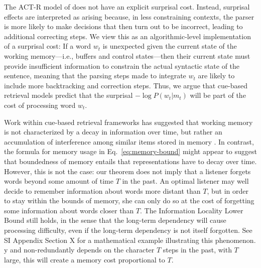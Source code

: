 The ACT-R model of \cite{lewis-activation-based-2005} does not have an explicit surprisal cost.
Instead, surprisal effects are interpreted as arising because, in less constraining contexts, the parser is more likely to make decisions that then turn out to be incorrect, leading to additional correcting steps.
We view this as an algorithmic-level implementation of a surprisal cost:
If a word $w_t$ is unexpected given the current state of the working memory---i.e., buffers and control states---then their current state must provide insufficient information to constrain the actual syntactic state of the sentence, meaning that the parsing steps made to integrate $w_t$ are likely to include more backtracking and correction steps.
Thus, we argue that cue-based retrieval models predict that the surprisal $- \log P(w_t|m_t)$ will be part of the cost of processing word $w_t$.

Work within cue-based retrieval frameworks has suggested that working memory is not characterized by a decay in information over time, but rather an accumulation of interference among similar items stored in memory \citep[][p. 408]{lewis-activation-based-2005}.
In contrast, the formula for memory usage in Eq.~\ref{eq:memory-bound} might appear to suggest that boundedness of memory entails that representations have to decay over time.
However, this is not the case:
our theorem does not imply that a listener forgets words beyond some amount of time $T$ in the past. 
An optimal listener may well decide to remember information about words more distant than $T$, but in order to stay within the bounds of memory, she can only do so at the cost of forgetting some information about words closer than $T$.
The Information Locality Lower Bound still holds, in the sense that the long-term dependency will cause processing difficulty, even if the long-term dependency is not itself forgotten.
See SI Appendix Section X for a mathematical example illustrating this phenomenon.
y and non-redundantly depends on the character $T$ steps in the past, with $T$ large, this will create a memory cost proportional to $T$.


